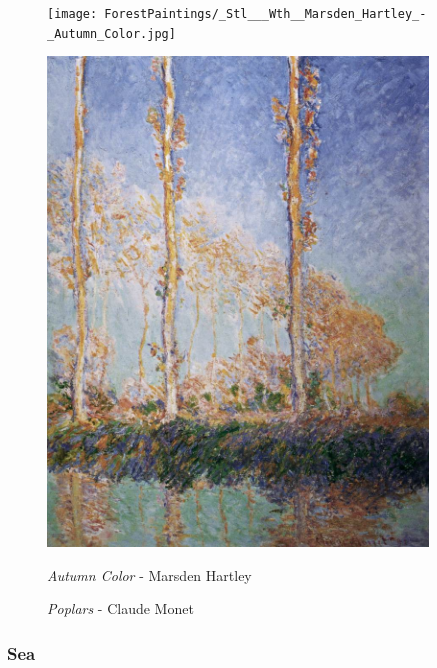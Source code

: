 \documentclass[a4paper]{article}
\begin{document}
\begin {figure}[h!]
\centering
\begin{minipage}[b]{.49\textwidth}
	\centering
	\texttt{[image: ForestPaintings/\_Stl\_\_\_Wth\_\_Marsden\_Hartley\_-\_Autumn\_Color.jpg]}
\end{minipage}
\hfill
\begin{minipage}[b]{.49\textwidth}
	\centering
	\includegraphics[width=0.9\textwidth]{ForestPaintings/_Ext___Stl___Wth__Claude_Monet_-_Poplars.jpg}
\end{minipage}
\begin{minipage}[t]{.49\textwidth}
	\caption{\emph{Autumn Color} - Marsden Hartley}
\end{minipage}
\begin{minipage}[t]{.49\textwidth}
	\caption{\emph{Poplars} - Claude Monet}
\end{minipage}
\end{figure}

\newpage
\subsubsection{Sea}
\end{document}
